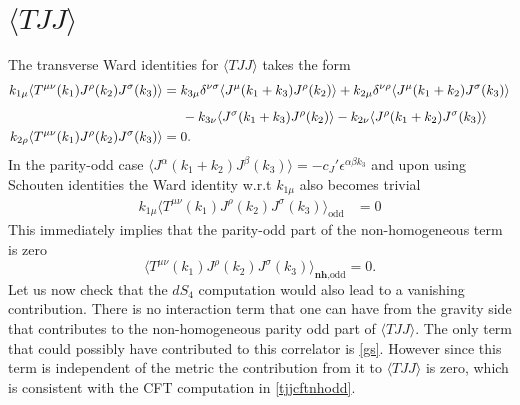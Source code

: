 \documentclass[a4paper,11pt]{article}
\begin{document}
 \section*{$\langle TJJ\rangle $}
The transverse Ward identities for $\langle TJJ\rangle $ takes the form 
%
 \begin{align}\label{tjjoddwi}
\begin{split}
k_{1\mu}\langle T^{\mu\nu}(k_1)J^{\rho}(k_2)J^{\sigma}(k_3) \rangle &= k_{3\mu}\delta^{\nu\sigma} \langle J^{\mu}(k_1+k_3)J^{\rho}(k_2) \rangle+k_{2\mu}\delta^{\nu\rho}\langle J^{\mu}(k_1+k_2)J^{\sigma}(k_3) \rangle\\[5 pt]
&\hspace{.5cm}-k_{3\nu}\langle J^{\sigma}(k_1+k_3)J^{\rho}(k_2) \rangle-k_{2\nu}\langle J^{\rho}(k_1+k_2) J^{\sigma}(k_3) \rangle\\
k_{2\rho}\langle T^{\mu\nu}(k_1)J^{\rho}(k_2)J^{\sigma}(k_3) \rangle &=0.
\end{split}
\end{align}
In the parity-odd case $\langle J^{\alpha}(k_1+k_2) J^{\beta}(k_3) \rangle = -c_J' \epsilon^{\alpha \beta k_3}$ and upon using Schouten identities the Ward identity w.r.t $k_{1\mu}$ also becomes trivial
%
\begin{align}\label{tjjoddwifnl}
k_{1\mu}\langle T^{\mu\nu}(k_1)J^{\rho}(k_2)J^{\sigma}(k_3) \rangle_{\text{odd}} &= 0
\end{align}
This immediately implies that the parity-odd part of the non-homogeneous term is zero 
\begin{equation}
\label{tjjcftnhodd}
   \langle T^{\mu\nu}(k_1)J^{\rho}(k_2)J^{\sigma}(k_3) \rangle_{\textbf{nh},\text{odd}} =0.
\end{equation}
Let us now check that the $dS_4$ computation would also lead to a vanishing contribution. There is no interaction term that one can have from the gravity side that contributes to the non-homogeneous parity odd part of $\langle TJJ\rangle.$  
 The only term that could possibly have contributed to this correlator is \eqref{gs}. However since this term is  independent of the metric the contribution from it to $\langle TJJ\rangle$ is zero, 
which is consistent with the CFT computation in \eqref{tjjcftnhodd}.
 

 
\end{document}
